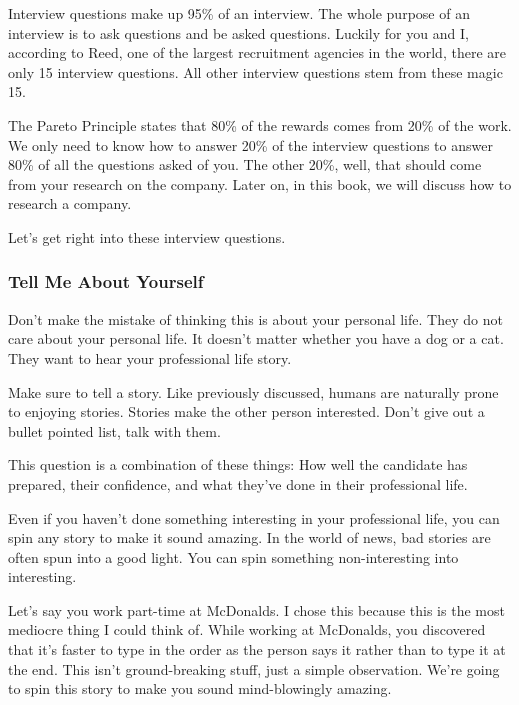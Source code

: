 \documentclass{article}
\begin{document}
Interview questions make up 95\% of an interview. The whole purpose of
an interview is to ask questions and be asked questions. Luckily for you
and I, according to Reed, one of the largest recruitment agencies in the
world, there are only 15 interview questions. All other interview
questions stem from these magic 15.

The Pareto Principle states that 80\% of the rewards comes from 20\% of
the work. We only need to know how to answer 20\% of the interview
questions to answer 80\% of all the questions asked of you. The other
20\%, well, that should come from your research on the company. Later
on, in this book, we will discuss how to research a company.

Let's get right into these interview questions.
\subsubsection{Tell Me About Yourself}
Don't make the mistake of thinking this is about your personal life.
They do not care about your personal life. It doesn't matter whether you
have a dog or a cat. They want to hear your professional life story.

Make sure to tell a story. Like previously discussed, humans are
naturally prone to enjoying stories. Stories make the other person
interested. Don't give out a bullet pointed list, talk with them.

This question is a combination of these things: How well the candidate
has prepared, their confidence, and what they've done in their
professional life.

Even if you haven't done something interesting in your professional
life, you can spin any story to make it sound amazing. In the world of
news, bad stories are often spun into a good light. You can spin
something non-interesting into interesting.

Let's say you work part-time at McDonalds. I chose this because this is
the most mediocre thing I could think of. While working at McDonalds,
you discovered that it's faster to type in the order as the person says
it rather than to type it at the end. This isn't ground-breaking stuff,
just a simple observation. We're going to spin this story to make you
sound mind-blowingly amazing.
\end{document}
